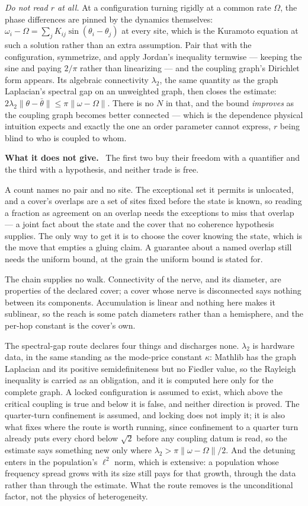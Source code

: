 \documentclass[11pt]{article}
\newcommand{\scope}{\par\smallskip\noindent\textbf{What it does not give.}\ }
\begin{document}
\emph{Do not read $r$ at all.} At a configuration turning rigidly at a common
rate $\Omega$, the phase differences are pinned by the dynamics themselves:
$\omega_i-\Omega=\sum_j K_{ij}\sin(\theta_i-\theta_j)$ at every site, which is
the Kuramoto equation at such a solution rather than an extra assumption. Pair
that with the configuration, symmetrize, and apply Jordan's inequality termwise
--- keeping the sine and paying $2/\pi$ rather than linearizing --- and the
coupling graph's Dirichlet form appears. Its algebraic connectivity $\lambda_2$,
the same quantity as the graph Laplacian's spectral gap on an unweighted graph,
then closes the estimate:
$2\lambda_2\lVert\theta-\bar\theta\rVert\le\pi\lVert\omega-\Omega\rVert$. There
is no $N$ in that, and the bound \emph{improves} as the coupling graph becomes
better connected --- which is the dependence physical intuition expects and
exactly the one an order parameter cannot express, $r$ being blind to who is
coupled to whom.

\scope
The first two buy their freedom with a quantifier and the third with a
hypothesis, and neither trade is free.

A count names no pair and no site. The exceptional set it permits is unlocated,
and a cover's overlaps are a set of sites fixed before the state is known, so
reading a fraction as agreement on an overlap needs the exceptions to miss that
overlap --- a joint fact about the state and the cover that no coherence
hypothesis supplies. The only way to get it is to choose the cover knowing the
state, which is the move that empties a gluing claim. A guarantee about a named
overlap still needs the uniform bound, at the grain the uniform bound is stated
for.

The chain supplies no walk. Connectivity of the nerve, and its diameter, are
properties of the declared cover; a cover whose nerve is disconnected says
nothing between its components. Accumulation is linear and nothing here makes it
sublinear, so the reach is some \waveNerveDiameters{} patch diameters rather
than a hemisphere, and the per-hop constant is the cover's own.

The spectral-gap route declares four things and discharges none. $\lambda_2$ is
hardware data, in the same standing as the mode-price constant $\kappa$: Mathlib
has the graph Laplacian and its positive semidefiniteness but no Fiedler value,
so the Rayleigh inequality is carried as an obligation, and it is computed here
only for the complete graph. A locked configuration is assumed to exist, which
above the critical coupling is true and below it is false, and neither direction
is proved. The quarter-turn confinement is assumed, and locking does not imply
it; it is also what
fixes where the route is worth running, since confinement to a quarter turn
already puts every chord below $\sqrt2$ before any coupling datum is read, so
the estimate says something new only where
$\lambda_2>\pi\lVert\omega-\Omega\rVert/2$. And the detuning enters in the population's $\ell^{2}$ norm, which is
extensive: a population whose frequency spread grows with its size still pays
for that growth, through the data rather than through the estimate. What the
route removes is the unconditional factor, not the physics of heterogeneity.
\end{document}
